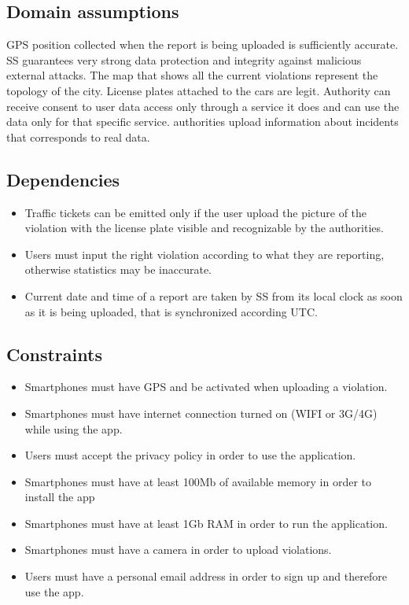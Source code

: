 \documentclass[../RASD.tex]{subfiles}
\begin{document}
    \subsection{Domain assumptions}\label{subsec:domain-assumpiton}
    \begin{enumerate}
         GPS position collected when the report is being uploaded is sufficiently accurate.
        SS guarantees very strong data protection and integrity against malicious external attacks.
         The map that shows all the current violations represent the topology of the city.
         License plates attached to the cars are legit.
        Authority can receive consent to user data access only through a service it does and can use the data only for that specific service.
        authorities upload information about incidents that corresponds to real data.
    \end{enumerate}
    \subsection{Dependencies}\label{subsec:dependencies}
    \begin{itemize}
        \item Traffic tickets can be emitted only if the user upload the picture of the violation with the license plate visible and recognizable by the authorities.
        \item Users must input the right violation according to what they are reporting, otherwise statistics may be inaccurate.
        \item Current date and time of a report are taken by SS from its local clock as soon as it is being uploaded, that is synchronized according UTC.
    \end{itemize}
    \subsection{Constraints}\label{subsec:constraints}
    \begin{itemize}
        \item Smartphones must have GPS and be activated when uploading a violation.
        \item Smartphones must have internet connection turned on (WIFI or 3G/4G) while using the app.
        \item Users must accept the privacy policy in order to use the application.
        \item Smartphones must have at least 100Mb of available memory in order to install the app
        \item Smartphones must have at least 1Gb RAM in order to run the application.
        \item Smartphones must have a camera in order to upload violations.
        \item Users must have a personal email address in order to sign up and therefore use the app.
    \end{itemize}
\end{document}
